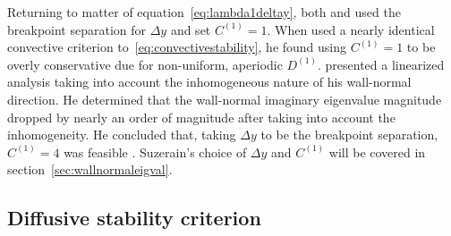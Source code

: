 \documentclass[letterpaper,11pt,nointlimits,reqno,draft]{amsbook}
\begin{document}
Returning to matter of equation~\eqref{eq:lambda1deltay}, both
\citeauthor{Guarini1998} and \citeauthor{Kwok2002} used the breakpoint
separation for $\Delta{}y$ and set $C^{(1)} = 1$.  When
\citeauthor{Venugopal2003} used a nearly identical convective criterion
to~\eqref{eq:convectivestability}, he found using $C^{(1)} = 1$ to be overly
conservative due for non-uniform, aperiodic $D^{(1)}$.
\citet[\textsection{}3.2]{Venugopal2003} presented a linearized analysis taking
into account the inhomogeneous nature of his wall-normal direction.  He
determined that the wall-normal imaginary eigenvalue magnitude dropped by
nearly an order of magnitude after taking into account the inhomogeneity.  He
concluded that, taking $\Delta{}y$ to be the breakpoint separation, $C^{(1)} =
4$ was feasible \citep[equation~3.29]{Venugopal2003}.  Suzerain's choice of
$\Delta{}y$ and $C^{(1)}$ will be covered in
section~\ref{sec:wallnormaleigval}.

\subsection{Diffusive stability criterion}
\label{sec:diffusivestability}
\end{document}
